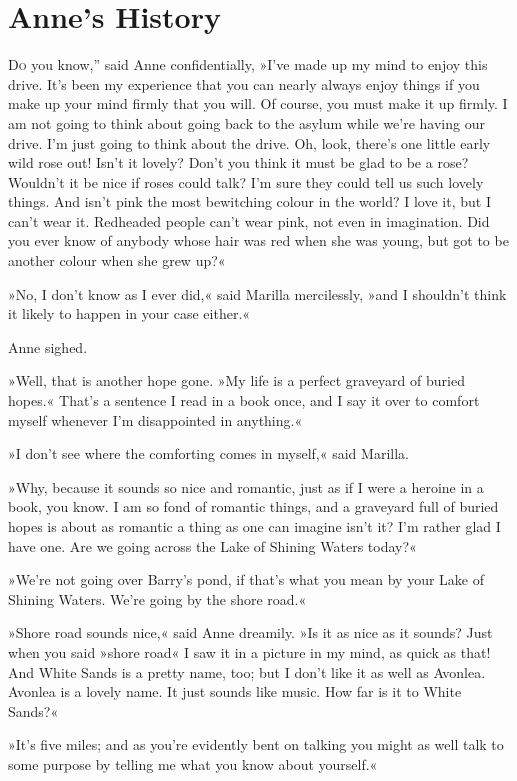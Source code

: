 \chapter{Anne's History}

\lettrine[ante=“,lines=4]{D}{o} you know,” said Anne confidentially, »I've made up my mind to enjoy this drive. It's been my experience that you can nearly always enjoy things if you make up your mind firmly that you will. Of course, you must make it up firmly. I am not going to think about going back to the asylum while we're having our drive. I'm just going to think about the drive. Oh, look, there's one little early wild rose out! Isn't it lovely? Don't you think it must be glad to be a rose? Wouldn't it be nice if roses could talk? I'm sure they could tell us such lovely things. And isn't pink the most bewitching colour in the world? I love it, but I can't wear it. Redheaded people can't wear pink, not even in imagination. Did you ever know of anybody whose hair was red when she was young, but got to be another colour when she grew up?«

»No, I don't know as I ever did,« said Marilla mercilessly, »and I shouldn't think it likely to happen in your case either.«

Anne sighed.

»Well, that is another hope gone. »My life is a perfect graveyard of buried hopes.« That's a sentence I read in a book once, and I say it over to comfort myself whenever I'm disappointed in anything.«

»I don't see where the comforting comes in myself,« said Marilla.

»Why, because it sounds so nice and romantic, just as if I were a heroine in a book, you know. I am so fond of romantic things, and a graveyard full of buried hopes is about as romantic a thing as one can imagine isn't it? I'm rather glad I have one. Are we going across the Lake of Shining Waters today?«

»We're not going over Barry's pond, if that's what you mean by your Lake of Shining Waters. We're going by the shore road.«

»Shore road sounds nice,« said Anne dreamily. »Is it as nice as it sounds? Just when you said »shore road« I saw it in a picture in my mind, as quick as that! And White Sands is a pretty name, too; but I don't like it as well as Avonlea. Avonlea is a lovely name. It just sounds like music. How far is it to White Sands?«

»It's five miles; and as you're evidently bent on talking you might as well talk to some purpose by telling me what you know about yourself.«


